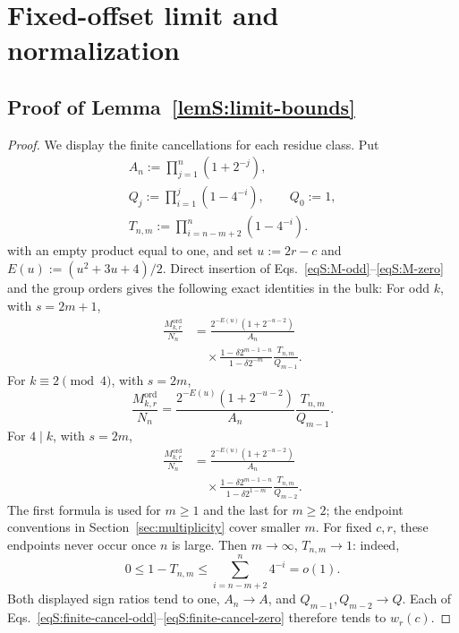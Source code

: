 \documentclass[journal,twocolumn]{IEEEtran}
\theoremstyle{definition}
\theoremstyle{plain}
\newcommand{\Ord}{\mathrm{ord}}
\begin{document}
\section{Fixed-offset limit and normalization}
\label{app:limit}

\subsection{Proof of Lemma~\ref{lemS:limit-bounds}}
\label{app:proof-limit-bounds}

\begin{proof}
We display the finite cancellations for each residue class.  Put
\begin{equation}
 \begin{gathered}
 A_n:=\prod_{j=1}^n(1+2^{-j}),\\
 Q_j:=\prod_{i=1}^j(1-4^{-i}),\qquad Q_0:=1,\\
 T_{n,m}:=\prod_{i=n-m+2}^{n}(1-4^{-i}).
 \end{gathered}
 \label{eqS:finite-products}
\end{equation}
with an empty product equal to one, and set
$u:=2r-c$ and $E(u):=(u^2+3u+4)/2$.  Direct insertion of
Eqs.~\eqref{eqS:M-odd}--\eqref{eqS:M-zero} and the group orders gives the
following exact identities in the bulk:
For odd $k$, with $s=2m+1$,
\begin{equation}
 \begin{aligned}
 \frac{M^{\Ord}_{k,r}}{N_n}
 &=\frac{2^{-E(u)}(1+2^{-u-2})}{A_n}\\
 &\quad\times\frac{1-\delta2^{m-1-n}}{1-\delta2^{-m}}
   \frac{T_{n,m}}{Q_{m-1}}.
 \end{aligned}
 \label{eqS:finite-cancel-odd}
\end{equation}
For $k\equiv2\pmod4$, with $s=2m$,
\begin{equation}
 \frac{M^{\Ord}_{k,r}}{N_n}
 =\frac{2^{-E(u)}(1+2^{-u-2})}{A_n}
   \frac{T_{n,m}}{Q_{m-1}}.
 \label{eqS:finite-cancel-two}
\end{equation}
For $4\mid k$, with $s=2m$,
\begin{equation}
 \begin{aligned}
 \frac{M^{\Ord}_{k,r}}{N_n}
 &=\frac{2^{-E(u)}(1+2^{-u-2})}{A_n}\\
 &\quad\times\frac{1-\delta2^{m-1-n}}{1-\delta2^{1-m}}
   \frac{T_{n,m}}{Q_{m-2}}.
 \end{aligned}
 \label{eqS:finite-cancel-zero}
\end{equation}
The first formula is used for $m\geq1$ and the last for $m\geq2$; the
endpoint conventions in Section~\ref{sec:multiplicity} cover smaller $m$.  For fixed $c,r$,
these endpoints never occur once $n$ is large.  Then $m\to\infty$,
$T_{n,m}\to1$: indeed,
\begin{equation}
 0\leq1-T_{n,m}
 \leq\sum_{i=n-m+2}^{n}4^{-i}=o(1).
 \label{eqS:T-tail-bound}
\end{equation}
Both displayed sign ratios tend to one,
$A_n\to A$, and $Q_{m-1},Q_{m-2}\to Q$.  Each of
Eqs.~\eqref{eqS:finite-cancel-odd}--\eqref{eqS:finite-cancel-zero}
therefore tends to $w_r(c)$.


\end{proof}
\end{document}
